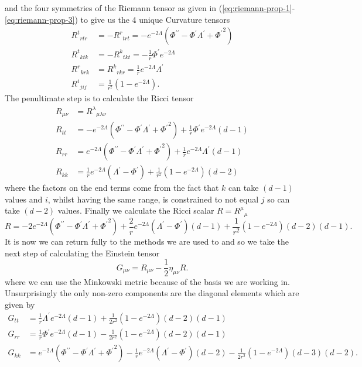 \documentclass[12pt]{article}
\numberwithin{equation}{section}
\numberwithin{figure}{section}
\begin{document}
and the four symmetries of the Riemann tensor as given in (\ref{eq:riemann-prop-1}-\ref{eq:riemann-prop-3}) to give us the 4 unique Curvature tensors
\begin{align}
{R^{t}}_{rtr} &=-{R^{r}}_{trt} = - e^{-2\Lambda}(\Phi ^{\prime\prime} - \Phi ^{\prime} \Lambda ^{\prime} +{\Phi ^{\prime}}^2)\\
{R^{t}}_{ktk} &=-{R^{k}}_{tkt} = -\frac{1}{r} \Phi ^{\prime} e^{-2\Lambda}\\
{R^{r}}_{krk} &= {R^{k}}_{rkr} = \frac{1}{r} e^{-2\Lambda} \Lambda ^{\prime} \\
{R^{i}}_{jij} &=				 \frac{1}{r^{2}}(1-e^{-2\Lambda}).
\end{align}
The penultimate step is to calculate the Ricci tensor
\begin{align}
R_{\mu\nu}&={R^{\lambda}}_{\mu\lambda\nu}\\
R_{tt} &= - e^{-2\Lambda}(\Phi ^{\prime\prime} - \Phi ^{\prime} \Lambda ^{\prime} +{\Phi ^{\prime}}^2)+ \frac{1}{r} \Phi ^{\prime} e^{-2\Lambda}(d-1)\\
R_{rr} &= e^{-2\Lambda}(\Phi ^{\prime\prime} - \Phi ^{\prime} \Lambda ^{\prime} +{\Phi ^{\prime}}^2) +\frac{1}{r} e^{-2\Lambda} \Lambda ^{\prime}(d-1)\\
R_{kk} &= \frac{1}{r} e^{-2\Lambda}(\Lambda ^{\prime} -\Phi ^{\prime} ) + \frac{1}{r^{2}}(1-e^{-2\Lambda})(d-2)
\end{align}
where the factors on the end terms come from the fact that $k$ can take $(d-1)$ values and $i$, whilst having the same range, is constrained to not equal $j$ so can take $(d-2)$ values. Finally we calculate the Ricci scalar $R={R^{\mu}}_{\mu}$
\begin{equation}
	R= -2e^{-2\Lambda}(\Phi ^{\prime\prime} - \Phi ^{\prime} \Lambda ^{\prime} +{\Phi ^{\prime}}^2) +\frac{2}{r} e^{-2\Lambda}(\Lambda ^{\prime} -\Phi ^{\prime})(d-1)+ \frac{1}{r^{2}}(1-e^{-2\Lambda})(d-2)(d-1).
\end{equation}
It is now we can return fully to the methods we are used to and so we take the next step of calculating the Einstein tensor 
\begin{equation}
	G_{\mu\nu} = R_{\mu\nu}-\frac{1}{2}\eta_{\mu\nu}R.
\end{equation}
where we can use the Minkowski metric because of the basis we are working in. Unsurprisingly the only non-zero components are the diagonal elements which are given by
\begin{align}
G_{tt}&= \frac{1}{r} \Lambda ^{\prime} e^{-2\Lambda}(d-1) + \frac{1}{2r^{2}}(1-e^{-2\Lambda})(d-2)(d-1)\label{eq:einstein_tensor_higher_d_1} \\
G_{rr}&= \frac{1}{r} \Phi ^{\prime} e^{-2\Lambda}(d-1) - \frac{1}{2r^{2}}(1-e^{-2\Lambda})(d-2)(d-1) \\
G_{kk}&= e^{-2\Lambda}(\Phi ^{\prime\prime} - \Phi ^{\prime} \Lambda ^{\prime} +{\Phi ^{\prime}}^2) -\frac{1}{r} e^{-2\Lambda}(\Lambda ^{\prime} -\Phi ^{\prime})(d-2)- \frac{1}{2r^{2}}(1-e^{-2\Lambda})(d-3)(d-2).\label{eq:einstein_tensor_higher_d_3}
\end{align}
\end{document}
